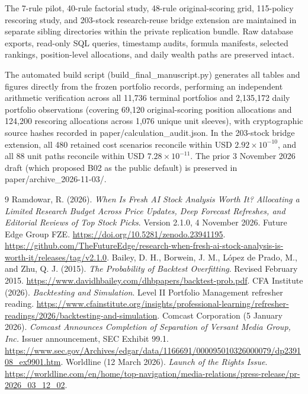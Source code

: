 \documentclass[11pt,a4paper]{article}
\numberwithin{table}{section}
\begin{document}
The 7-rule pilot, 40-rule factorial study, 48-rule original-scoring grid, 115-policy rescoring study, and 203-stock research-reuse bridge extension are maintained in separate sibling directories within the private replication bundle. Raw database exports, read-only SQL queries, timestamp audits, formula manifests, selected rankings, position-level allocations, and daily wealth paths are preserved intact.

The automated build script (build\_final\_manuscript.py) generates all tables and figures directly from the frozen portfolio records, performing an independent arithmetic verification across all 11,736 terminal portfolios and 2,135,172 daily portfolio observations (covering 69,120 original-scoring position allocations and 124,200 rescoring allocations across 1,076 unique unit sleeves), with cryptographic source hashes recorded in paper/calculation\_audit.json. In the 203-stock bridge extension, all 480 retained cost scenarios reconcile within USD $2.92 \times 10^{-10}$, and all 88 unit paths reconcile within USD $7.28 \times 10^{-11}$. The prior 3 November 2026 draft (which proposed B02 as the public default) is preserved in paper/archive\_2026-11-03/.

\begin{thebibliography}{9}
 Ramdowar, R. (2026). \emph{When Is Fresh AI Stock Analysis
Worth It? Allocating a Limited Research Budget Across Price Updates,
Deep Forecast Refreshes, and Editorial Reviews of Top Stock Picks}.
Version 2.1.0, 4 November 2026. Future Edge Group FZE.
\url{https://doi.org/10.5281/zenodo.23941195}.
\url{https://github.com/TheFutureEdge/research-when-fresh-ai-stock-analysis-is-worth-it/releases/tag/v2.1.0}.
 Bailey, D. H., Borwein, J. M., L\'opez de Prado, M., and
Zhu, Q. J. (2015). \emph{The Probability of Backtest Overfitting}.
Revised February 2015. \url{https://www.davidhbailey.com/dhbpapers/backtest-prob.pdf}.
 CFA Institute (2026). \emph{Backtesting and Simulation}.
Level II Portfolio Management refresher reading.
\url{https://www.cfainstitute.org/insights/professional-learning/refresher-readings/2026/backtesting-and-simulation}.
 Comcast Corporation (5 January 2026).
\emph{Comcast Announces Completion of Separation of Versant Media Group, Inc.}
Issuer announcement, SEC Exhibit 99.1.
\url{https://www.sec.gov/Archives/edgar/data/1166691/000095010326000079/dp239108_ex9901.htm}.
 Worldline (12 March 2026).
\emph{Launch of the Rights Issue}.
\url{https://worldline.com/en/home/top-navigation/media-relations/press-release/pr-2026_03_12_02}.
\end{thebibliography}
\end{document}
